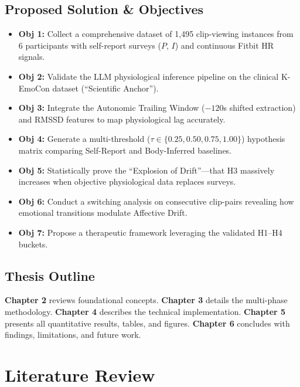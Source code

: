 \documentclass[11pt, a4paper]{report}
\begin{document}
\section{Proposed Solution \& Objectives}
\begin{itemize}
    \item \textbf{Obj 1:} Collect a comprehensive dataset of 1,495 clip-viewing instances from 6 participants with self-report surveys ($P$, $I$) and continuous Fitbit HR signals.
    \item \textbf{Obj 2:} Validate the LLM physiological inference pipeline on the clinical K-EmoCon dataset (``Scientific Anchor'').
    \item \textbf{Obj 3:} Integrate the Autonomic Trailing Window ($-120$s shifted extraction) and RMSSD features to map physiological lag accurately.
    \item \textbf{Obj 4:} Generate a multi-threshold ($\tau \in \{0.25, 0.50, 0.75, 1.00\}$) hypothesis matrix comparing Self-Report and Body-Inferred baselines.
    \item \textbf{Obj 5:} Statistically prove the ``Explosion of Drift''---that H3 massively increases when objective physiological data replaces surveys.
    \item \textbf{Obj 6:} Conduct a switching analysis on consecutive clip-pairs revealing how emotional transitions modulate Affective Drift.
    \item \textbf{Obj 7:} Propose a therapeutic framework leveraging the validated H1--H4 buckets.
\end{itemize}

\section{Thesis Outline}
\textbf{Chapter 2} reviews foundational concepts. \textbf{Chapter 3} details the multi-phase methodology. \textbf{Chapter 4} describes the technical implementation. \textbf{Chapter 5} presents all quantitative results, tables, and figures. \textbf{Chapter 6} concludes with findings, limitations, and future work.


\chapter{Literature Review}
\label{chap:related}
\end{document}
